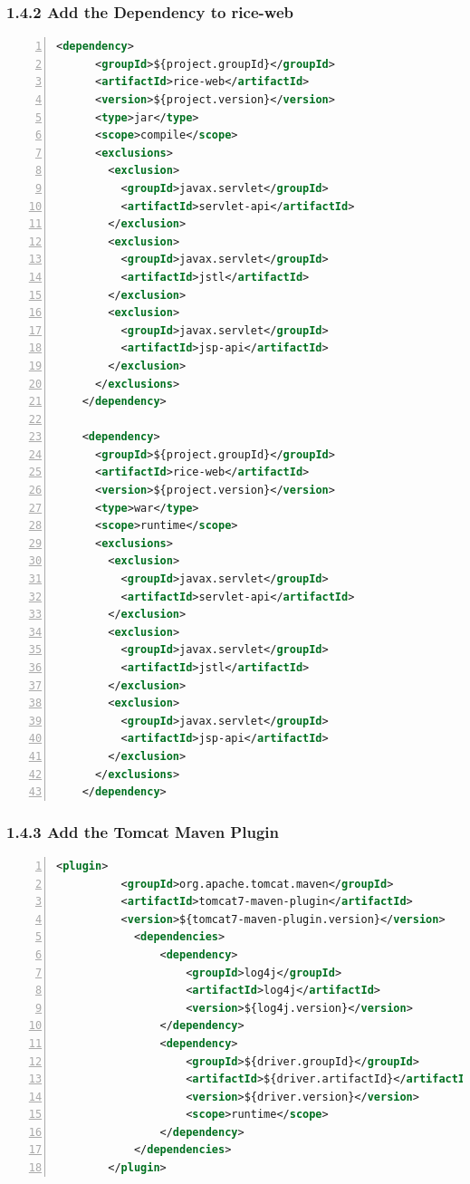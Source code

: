 \subsubsection*{1.4.2 Add the Dependency to rice-web}
\begin{lstlisting}[numbers=left,language=xml,basicstyle=\scriptsize,backgroundcolor=\color{ubergray},caption={training/pom.xml},frame=single,breaklines=true]
    <dependency>
      <groupId>${project.groupId}</groupId>
      <artifactId>rice-web</artifactId>
      <version>${project.version}</version>
      <type>jar</type>
      <scope>compile</scope>
      <exclusions>
        <exclusion>
          <groupId>javax.servlet</groupId>
          <artifactId>servlet-api</artifactId>
        </exclusion>
        <exclusion>
          <groupId>javax.servlet</groupId>
          <artifactId>jstl</artifactId>
        </exclusion>
        <exclusion>
          <groupId>javax.servlet</groupId>
          <artifactId>jsp-api</artifactId>
        </exclusion>
      </exclusions>
    </dependency>

    <dependency>
      <groupId>${project.groupId}</groupId>
      <artifactId>rice-web</artifactId>
      <version>${project.version}</version>
      <type>war</type>
      <scope>runtime</scope>
      <exclusions>
        <exclusion>
          <groupId>javax.servlet</groupId>
          <artifactId>servlet-api</artifactId>
        </exclusion>
        <exclusion>
          <groupId>javax.servlet</groupId>
          <artifactId>jstl</artifactId>
        </exclusion>
        <exclusion>
          <groupId>javax.servlet</groupId>
          <artifactId>jsp-api</artifactId>
        </exclusion>
      </exclusions>
    </dependency>
\end{lstlisting}

\subsubsection*{1.4.3 Add the Tomcat Maven Plugin}
\begin{lstlisting}[numbers=left,language=xml,basicstyle=\scriptsize,backgroundcolor=\color{ubergray},caption={training/pom.xml},frame=single,breaklines=true]
        <plugin>
          <groupId>org.apache.tomcat.maven</groupId>
          <artifactId>tomcat7-maven-plugin</artifactId>
          <version>${tomcat7-maven-plugin.version}</version>
            <dependencies>
                <dependency>
                    <groupId>log4j</groupId>
                    <artifactId>log4j</artifactId>
                    <version>${log4j.version}</version>
                </dependency>
                <dependency>
                    <groupId>${driver.groupId}</groupId>
                    <artifactId>${driver.artifactId}</artifactId>
                    <version>${driver.version}</version>
                    <scope>runtime</scope>
                </dependency>
            </dependencies>
        </plugin>
\end{lstlisting}

